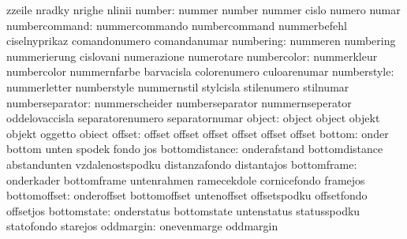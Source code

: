                           zzeile                    nradky
                           nrighe                    nlinii
                   number: nummer                    number
                           nummer                    cislo
                           numero                    numar
            numbercommand: nummercommando            numbercommand
                           nummerbefehl              ciselnyprikaz
                           comandonumero             comandanumar
                numbering: nummeren                  numbering
                           nummerierung              cislovani
                           numerazione               numerotare
              numbercolor: nummerkleur               numbercolor
                           nummernfarbe              barvacisla
                           colorenumero              culoarenumar
              numberstyle: nummerletter              numberstyle
                           nummernstil               stylcisla
                           stilenumero               stilnumar
          numberseparator: nummerscheider            numberseparator
                           nummernseperator          oddelovaccisla
                           separatorenumero          separatornumar
                   object: object                    object
                           objekt                    objekt
                           oggetto                   obiect
                   offset: offset                    offset
                           offset                    offset
                           offset                    offset
                   bottom: onder                     bottom
                           unten                     spodek
                           fondo                     jos
           bottomdistance: onderafstand              bottomdistance
                           abstandunten              vzdalenostspodku
                           distanzafondo             distantajos
              bottomframe: onderkader                bottomframe
                           untenrahmen               ramecekdole
                           cornicefondo              framejos
             bottomoffset: onderoffset               bottomoffset
                           untenoffset               offsetspodku
                           offsetfondo               offsetjos
              bottomstate: onderstatus               bottomstate
                           untenstatus               statusspodku
                           statofondo                starejos
                oddmargin: onevenmarge               oddmargin
